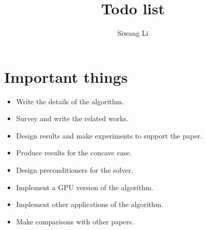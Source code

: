 \documentclass[9pt,twocolumn]{extarticle}
\author{Siwang Li}
\title{Todo list}
\begin{document}
\maketitle

\setlength{\parskip}{0.5ex}

\section{Important things}
\begin{itemize}
  
\item Write the details of the algorithm.
  
\item Survey and write the related works.

\item Design results and make experiments to support the paper.

\item Produce results for the concave case.

\item Design preconditioners for the solver.

\item Implement a GPU version of the algorithm.

\item Implement other applications of the algorithm. 

\item Make comparisons with other papers.
  
\end{itemize}
\end{document}
